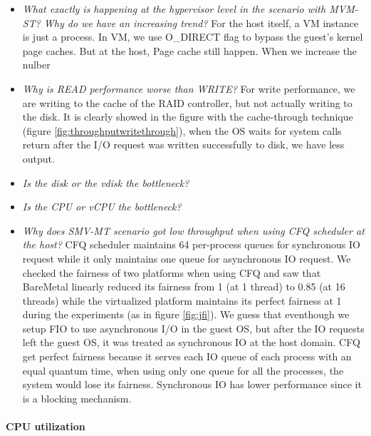\documentclass{acmsig}
\begin{document}
\begin{itemize}
 \item \textit{What exactly is happening at the hypervisor level in the scenario with MVM-ST? Why do we have an increasing trend?} For the host itself, a VM instance is just a process. In VM, we use O\_DIRECT flag to bypass the guest's kernel page caches. But at the host, Page cache still happen. When we increase the nulber
 \item \textit{Why is READ performance worse than WRITE?} For write performance, we are writing to the cache of the RAID controller, but not actually writing to the disk. It is clearly showed in the figure with the cache-through technique (figure \ref{fig:throughputwritethrough}), when the OS waits for system calls return after the I/O request was written successfully to disk, we have less output.
 \item \textit{Is the disk or the vdisk the bottleneck?} %
 \item \textit{Is the CPU or vCPU the bottleneck?} %
 \item \textit{Why does SMV-MT scenario got low throughput when using CFQ scheduler at the host?} CFQ scheduler maintains 64 per-process queues for synchronous IO request while it only maintains one queue for asynchronous IO request. We checked the fairness of two platforms when using CFQ and saw that BareMetal linearly reduced its fairness from 1 (at 1 thread) to 0.85 (at 16 threads) while the virtualized platform maintains its perfect fairness at 1 during the experiments (as in figure \ref{fig:jfi}). We guess that eventhough we setup FIO to use asynchronous I/O in the guest OS, but after the IO requests left the guest OS, it was treated as synchronous IO at the host domain. CFQ get perfect fairness because it serves each IO queue of each process with an equal quantum time, when using only one queue for all the processes, the system would lose its fairness. Synchronous IO has lower performance since it is a blocking mechanism.
\end{itemize}


\paragraph{CPU utilization}
\end{document}
